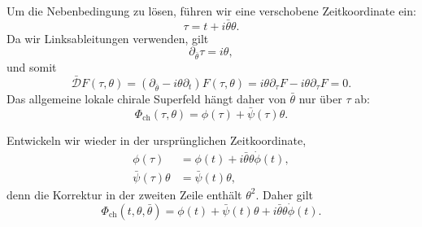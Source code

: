 Um die Nebenbedingung zu lösen, führen wir eine verschobene Zeitkoordinate ein:
\begin{equation}
\tau=t+i\bar\theta\theta.
\label{eq:l7-chiral-time}
\end{equation}
Da wir Linksableitungen verwenden, gilt
\begin{equation}
\partial_{\bar\theta}\tau=i\theta,
\end{equation}
und somit
\begin{equation}
\bar{\mathcal D}F(\tau,\theta)
=\left(\partial_{\bar\theta}-i\theta\partial_t\right)F(\tau,\theta)
=i\theta\partial_\tau F-i\theta\partial_\tau F=0.
\end{equation}
Das allgemeine lokale chirale Superfeld hängt daher von \(\bar\theta\) nur über \(\tau\) ab:
\begin{equation}
\Phi_{\mathrm{ch}}(\tau,\theta)
=\phi(\tau)+\bar\psi(\tau)\theta.
\label{eq:l7-chiral-field-tau}
\end{equation}

\begin{classroomqa}
\end{classroomqa}

Entwickeln wir wieder in der ursprünglichen Zeitkoordinate,
\begin{align}
\phi(\tau)
&=\phi(t)+i\bar\theta\theta\dot\phi(t),\\
\bar\psi(\tau)\theta
&=\bar\psi(t)\theta,
\end{align}
denn die Korrektur in der zweiten Zeile enthält \(\theta^2\). Daher gilt
\begin{equation}
\Phi_{\mathrm{ch}}(t,\theta,\bar\theta)
=\phi(t)+\bar\psi(t)\theta
+i\bar\theta\theta\dot\phi(t).
\label{eq:l7-chiral-field-components}
\end{equation}

\begin{classroomqa}
\end{classroomqa}

